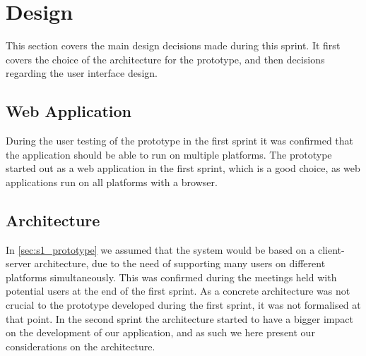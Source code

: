 \section{Design} \label{sec:s2_design}
This section covers the main design decisions made during this sprint. It first covers the choice of the architecture for the prototype, and then decisions regarding the user interface design.

\subsection{Web Application}

During the user testing of the prototype in the first sprint it was confirmed that the application should be able to run on multiple platforms. The prototype started out as a web application in the first sprint, which is a good choice, as web applications run on all platforms with a browser.

\subsection{Architecture} \label{sec:s2_architecture}
In \cref{sec:s1_prototype} we assumed that the system would be based on a client-server architecture, due to the need of supporting many users on different platforms simultaneously. This was confirmed during the meetings held with potential users at the end of the first sprint. As a concrete architecture was not crucial to the prototype developed during the first sprint, it was not formalised at that point. In the second sprint the architecture started to have a bigger impact on the development of our application, and as such we here present our considerations on the architecture.

